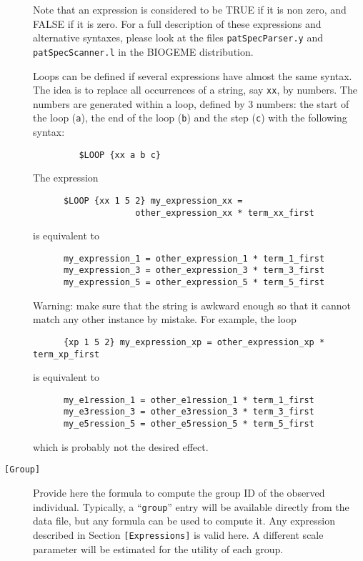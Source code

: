 \documentclass[12pt,a4paper]{article}
\newcommand{\specitem}[1]{\texttt{[#1]}}
\begin{document}
\begin{description}
      Note that an expression is considered to be TRUE if it is non zero, and FALSE if it is zero. 
      For a full description of these expressions and alternative syntaxes, please
      look at the files \texttt{patSpecParser.y} and \texttt{patSpecScanner.l} in the BIOGEME distribution.

      Loops can be defined if several expressions have almost the same syntax. 
      The idea is to replace all occurrences of a string, say \verb+xx+, by numbers. 
      The numbers are generated within a loop, defined by 3 numbers: the start of the loop (\verb+a+), 
      the end of the loop (\verb+b+) and the step (\verb+c+) with the following syntax:
      \begin{verbatim}
         $LOOP {xx a b c}
      \end{verbatim} 


      The expression
      \begin{verbatim}
      $LOOP {xx 1 5 2} my_expression_xx = 
                    other_expression_xx * term_xx_first
      \end{verbatim}
      is equivalent to 
      \begin{verbatim}
      my_expression_1 = other_expression_1 * term_1_first
      my_expression_3 = other_expression_3 * term_3_first
      my_expression_5 = other_expression_5 * term_5_first
      \end{verbatim} 

      Warning: make sure that the string is awkward enough so that it cannot match any other instance by mistake. For example, the loop
      \begin{verbatim}
      {xp 1 5 2} my_expression_xp = other_expression_xp * term_xp_first
      \end{verbatim}
      is equivalent to
      \begin{verbatim}
      my_e1ression_1 = other_e1ression_1 * term_1_first
      my_e3ression_3 = other_e3ression_3 * term_3_first
      my_e5ression_5 = other_e5ression_5 * term_5_first
      \end{verbatim} 
      which is probably not the desired effect.


   \item[\specitem{Group}]
      Provide here the formula to compute  the group ID of the  observed
      individual. Typically, a ``\verb+group+'' entry will be available directly
      from the data file, but
      any formula can be used to compute it.  Any expression
      described in Section \verb+[Expressions]+ is valid here. A
      different scale parameter will be estimated for the
      utility of each group.
      

\end{description}
\end{document}
